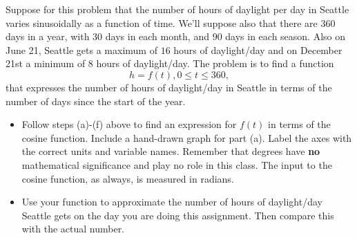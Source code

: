 \documentclass{ximera}
\begin{document}
\begin{question}  \label{Qdsg77jhre}
Suppose for this problem that the number of hours of daylight per day in Seattle varies sinusoidally as a function of time. We'll suppose also that there are 360 days in a year, with 30 days in each month, and 90 days in each season. Also on June 21, Seattle gets a maximum of $16$ hours of daylight/day and on December 21st a minimum of $8$ hours of daylight/day. The problem is to find a function 
\[
  h = f(t) , 0\leq t \leq 360 ,
\]
that expresses the number of hours of daylight/day in Seattle in terms of the number of days since the start of the year. 

\begin{itemize}
\item{Follow steps (a)-(f) above to find an expression for $f(t)$ in terms of the cosine function. Include a hand-drawn graph for part (a). Label the axes with the correct units and variable names. Remember that degrees have {\bf no} mathematical significance and play no role in this class. The input to the cosine function, as always, is measured in radians.}

\item{Use your function to approximate the number of hours of daylight/day Seattle gets on the day you are doing this assignment. Then compare this with the actual number.}
\end{itemize}


\end{question}
\end{document}
